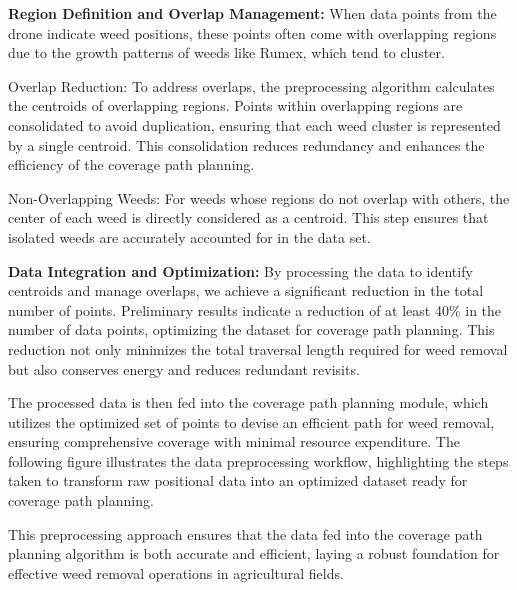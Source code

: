 \vspace*{6mm}  


\textbf{Region Definition and Overlap Management: } When data points from the drone indicate weed positions, these points often come with overlapping regions due to the growth patterns of weeds like Rumex, which tend to cluster.

\vspace*{6mm}  


Overlap Reduction: To address overlaps, the preprocessing algorithm calculates the centroids of overlapping regions. Points within overlapping regions are consolidated to avoid duplication, ensuring that each weed cluster is represented by a single centroid. This consolidation reduces redundancy and enhances the efficiency of the coverage path planning.

\vspace*{6mm}  


Non-Overlapping Weeds: For weeds whose regions do not overlap with others, the center of each weed is directly considered as a centroid. This step ensures that isolated weeds are accurately accounted for in the data set.

\vspace*{6mm}  


\textbf{Data Integration and Optimization: }
By processing the data to identify centroids and manage overlaps, we achieve a significant reduction in the total number of points. Preliminary results indicate a reduction of at least 40\% in the number of data points, optimizing the dataset for coverage path planning. This reduction not only minimizes the total traversal length required for weed removal but also conserves energy and reduces redundant revisits.

\vspace*{6mm}  


The processed data is then fed into the coverage path planning module, which utilizes the optimized set of points to devise an efficient path for weed removal, ensuring comprehensive coverage with minimal resource expenditure. The following figure illustrates the data preprocessing workflow, highlighting the steps taken to transform raw positional data into an optimized dataset ready for coverage path planning.

\vspace*{6mm}  



This preprocessing approach ensures that the data fed into the coverage path planning algorithm is both accurate and efficient, laying a robust foundation for effective weed removal operations in agricultural fields.

